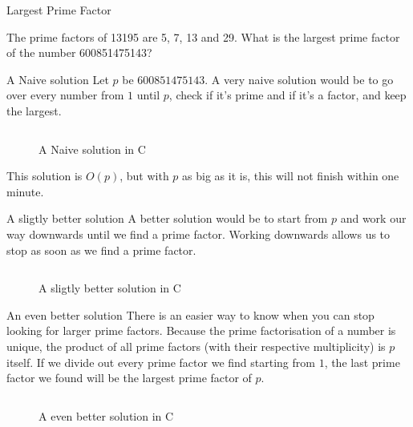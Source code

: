 \documentclass[main.tex]{subfiles}
\begin{document}
\begin{prob}{3}{Largest Prime Factor}
  \begin{problem}
    The prime factors of 13195 are 5, 7, 13 and 29.
    What is the largest prime factor of the number 600851475143?
  \end{problem}

  \begin{solutions}
    \begin{solution}{A Naive solution}
      Let $p$ be $600851475143$.
      A very naive solution would be to go over every number from $1$ until $p$, check if it's prime and if it's a factor, and keep the largest.
      \begin{figure}[H]
        \inputminted[firstline=19, lastline=28]{c}{\sol{003}{c}/naive.c}
        \caption{A Naive solution in C}
      \end{figure}
      This solution is $O(p)$, but with $p$ as big as it is, this will not finish within one minute.
    \end{solution}

    \begin{solution}{A sligtly better solution}
      A better solution would be to start from $p$ and work our way downwards until we find a prime factor.
      Working downwards allows us to stop as soon as we find a prime factor.
      \begin{figure}[H]
        \inputminted[firstline=19, lastline=27]{c}{\sol{003}{c}/better.c}
        \caption{A sligtly better solution in C}
      \end{figure}
    \end{solution}

    \begin{solution}{An even better solution}
      There is an easier way to know when you can stop looking for larger prime factors.
      Because the prime factorisation of a number is unique, the product of all prime factors (with their respective multiplicity) is $p$ itself.
      If we divide out every prime factor we find starting from $1$, the last prime factor we found will be the largest prime factor of $p$.

      \begin{figure}[H]
        \inputminted[firstline=19, lastline=29]{c}{\sol{003}{c}/solution.c}
        \caption{A even better solution in C}
      \end{figure}
    \end{solution}
  \end{solutions}
\end{prob}
\end{document}
